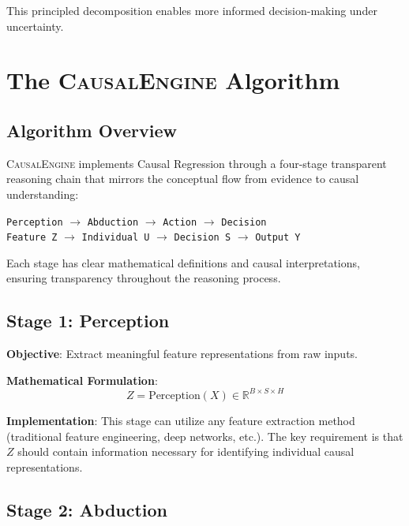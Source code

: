 \documentclass[conference]{IEEEtran}
\newcommand{\causalengine}{\textsc{CausalEngine}}
\newcommand{\reals}{\mathbb{R}}
\begin{document}
This principled decomposition enables more informed decision-making under uncertainty.

\section{The \causalengine{} Algorithm}
\label{sec:algorithm}

\subsection{Algorithm Overview}

\causalengine{} implements Causal Regression through a four-stage transparent reasoning chain that mirrors the conceptual flow from evidence to causal understanding:

\begin{center}
\texttt{Perception} $\rightarrow$ \texttt{Abduction} $\rightarrow$ \texttt{Action} $\rightarrow$ \texttt{Decision}\\
\texttt{Feature Z} $\rightarrow$ \texttt{Individual U} $\rightarrow$ \texttt{Decision S} $\rightarrow$ \texttt{Output Y}
\end{center}

Each stage has clear mathematical definitions and causal interpretations, ensuring transparency throughout the reasoning process.

\subsection{Stage 1: Perception}

\textbf{Objective}: Extract meaningful feature representations from raw inputs.

\textbf{Mathematical Formulation}:
\begin{equation}
Z = \text{Perception}(X) \in \reals^{B \times S \times H}
\end{equation}

\textbf{Implementation}: This stage can utilize any feature extraction method (traditional feature engineering, deep networks, etc.). The key requirement is that $Z$ should contain information necessary for identifying individual causal representations.

\subsection{Stage 2: Abduction}
\end{document}
